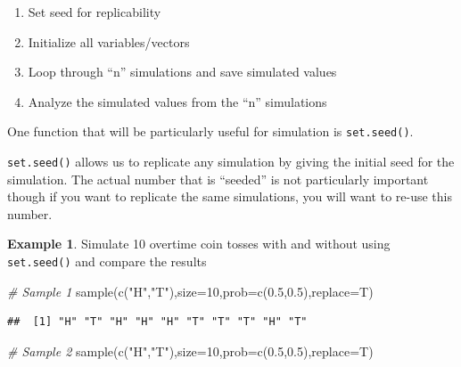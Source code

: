 \documentclass[
  11pt,
]{book}
\newenvironment{Shaded}{\begin{snugshade}}{\end{snugshade}}
\newcommand{\AttributeTok}[1]{\textcolor[rgb]{0.77,0.63,0.00}{#1}}
\newcommand{\CommentTok}[1]{\textcolor[rgb]{0.56,0.35,0.01}{\textit{#1}}}
\newcommand{\DecValTok}[1]{\textcolor[rgb]{0.00,0.00,0.81}{#1}}
\newcommand{\FloatTok}[1]{\textcolor[rgb]{0.00,0.00,0.81}{#1}}
\newcommand{\FunctionTok}[1]{\textcolor[rgb]{0.00,0.00,0.00}{#1}}
\newcommand{\NormalTok}[1]{#1}
\newcommand{\StringTok}[1]{\textcolor[rgb]{0.31,0.60,0.02}{#1}}
\theoremstyle{definition}
\theoremstyle{definition}
\newtheorem{example}{Example}[chapter]
\theoremstyle{definition}
\theoremstyle{definition}
\theoremstyle{remark}
\begin{document}
\begin{enumerate}
\def\labelenumi{\arabic{enumi})}
\item
  Set seed for replicability
\item
  Initialize all variables/vectors
\item
  Loop through ``n'' simulations and save simulated values
\item
  Analyze the simulated values from the ``n'' simulations
\end{enumerate}

One function that will be particularly useful for simulation is \texttt{set.seed()}.

\texttt{set.seed()} allows us to replicate any simulation by giving the initial seed for the simulation. The actual number that is ``seeded'' is not particularly important though if you want to replicate the same simulations, you will want to re-use this number.

\vfill
\newpage

\begin{example}
Simulate 10 overtime coin tosses with and without using \texttt{set.seed()} and compare the results
\end{example}

\begin{Shaded}
\begin{Highlighting}[]
\CommentTok{\# Sample 1}
\FunctionTok{sample}\NormalTok{(}\FunctionTok{c}\NormalTok{(}\StringTok{"H"}\NormalTok{,}\StringTok{"T"}\NormalTok{),}\AttributeTok{size=}\DecValTok{10}\NormalTok{,}\AttributeTok{prob=}\FunctionTok{c}\NormalTok{(}\FloatTok{0.5}\NormalTok{,}\FloatTok{0.5}\NormalTok{),}\AttributeTok{replace=}\NormalTok{T)}
\end{Highlighting}
\end{Shaded}

\begin{verbatim}
##  [1] "H" "T" "H" "H" "H" "T" "T" "T" "H" "T"
\end{verbatim}

\begin{Shaded}
\begin{Highlighting}[]
\CommentTok{\# Sample 2}
\FunctionTok{sample}\NormalTok{(}\FunctionTok{c}\NormalTok{(}\StringTok{"H"}\NormalTok{,}\StringTok{"T"}\NormalTok{),}\AttributeTok{size=}\DecValTok{10}\NormalTok{,}\AttributeTok{prob=}\FunctionTok{c}\NormalTok{(}\FloatTok{0.5}\NormalTok{,}\FloatTok{0.5}\NormalTok{),}\AttributeTok{replace=}\NormalTok{T)}
\end{Highlighting}
\end{Shaded}
\end{document}
